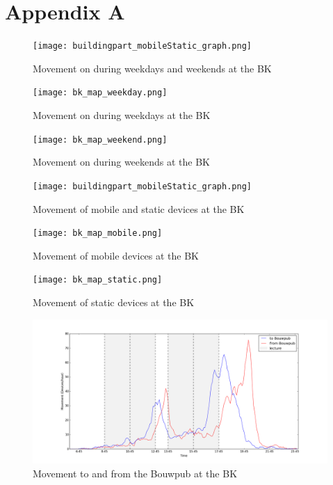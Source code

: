 \chapter{Appendix A}\label{appendixA}

\begin{figure}[H]
\centering
\texttt{[image: buildingpart\_mobileStatic\_graph.png]}
\captionsetup{justification=centering}
\caption{Movement on during weekdays and weekends at the BK}
\label{figure:bk_weekdayWeekend}
\end{figure}

\begin{figure}[H]
\centering
\texttt{[image: bk\_map\_weekday.png]}
\captionsetup{justification=centering}
\caption{Movement on during weekdays at the BK}
\label{map:bk_weekday}
\end{figure}

\begin{figure}[H]
\centering
\texttt{[image: bk\_map\_weekend.png]}
\captionsetup{justification=centering}
\caption{Movement on during weekends at the BK}
\label{map:bk_weekend}
\end{figure}

\begin{figure}[H]
\centering
\texttt{[image: buildingpart\_mobileStatic\_graph.png]}
\captionsetup{justification=centering}
\caption{Movement of mobile and static devices at the BK}
\label{figure:bk_MobileStatic}
\end{figure}

\begin{figure}[H]
\centering
\texttt{[image: bk\_map\_mobile.png]}
\captionsetup{justification=centering}
\caption{Movement of mobile devices at the BK}
\label{map:bk_mobile}
\end{figure}

\begin{figure}[H]
\centering
\texttt{[image: bk\_map\_static.png]}
\captionsetup{justification=centering}
\caption{Movement of static devices at the BK}
\label{map:bk_static}
\end{figure}

\begin{figure}[H]
\centering
\includegraphics[scale=0.35]{buildingpart_fromTo_bouwpubGraph.png}
\captionsetup{justification=centering}
\caption{Movement to and from the Bouwpub at the BK}
\label{figure:bk_Bouwpub}
\end{figure}

